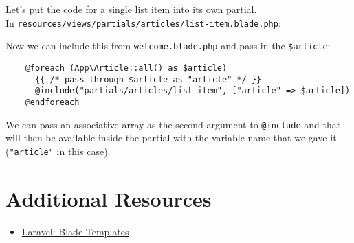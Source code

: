 Let's put the code for a single list item into its own partial.
\\

In \texttt{resources/views/partials/articles/list-item.blade.php}:


Now we can include this from \texttt{welcome.blade.php} and pass in the \texttt{\$article}:

\begin{verbatim}
    @foreach (App\Article::all() as $article)
      {{ /* pass-through $article as "article" */ }}
      @include("partials/articles/list-item", ["article" => $article])
    @endforeach
\end{verbatim}

We can pass an associative-array as the second argument to \texttt{@include} and that will then be available inside the partial with the variable name that we gave it (\texttt{"article"} in this case).

\section{Additional Resources}

\begin{itemize}[leftmargin=*]
    \item \href{http://laravel.com/docs/master/blade}{Laravel: Blade Templates}
\end{itemize}
